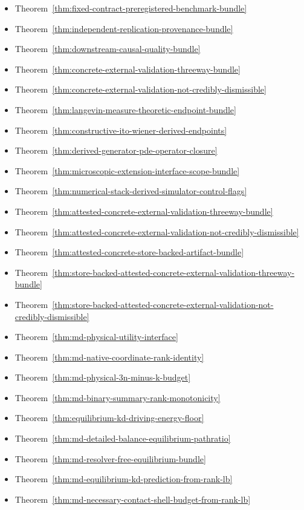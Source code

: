 \begin{itemize}
\item Theorem~\ref{thm:fixed-contract-preregistered-benchmark-bundle}
\item Theorem~\ref{thm:independent-replication-provenance-bundle}
\item Theorem~\ref{thm:downstream-causal-quality-bundle}
\item Theorem~\ref{thm:concrete-external-validation-threeway-bundle}
\item Theorem~\ref{thm:concrete-external-validation-not-credibly-dismissible}
\item Theorem~\ref{thm:langevin-measure-theoretic-endpoint-bundle}
\item Theorem~\ref{thm:constructive-ito-wiener-derived-endpoints}
\item Theorem~\ref{thm:derived-generator-pde-operator-closure}
\item Theorem~\ref{thm:microscopic-extension-interface-scope-bundle}
\item Theorem~\ref{thm:numerical-stack-derived-simulator-control-flags}
\item Theorem~\ref{thm:attested-concrete-external-validation-threeway-bundle}
\item Theorem~\ref{thm:attested-concrete-external-validation-not-credibly-dismissible}
\item Theorem~\ref{thm:attested-concrete-store-backed-artifact-bundle}
\item Theorem~\ref{thm:store-backed-attested-concrete-external-validation-threeway-bundle}
\item Theorem~\ref{thm:store-backed-attested-concrete-external-validation-not-credibly-dismissible}
\item Theorem~\ref{thm:md-physical-utility-interface}
\item Theorem~\ref{thm:md-native-coordinate-rank-identity}
\item Theorem~\ref{thm:md-physical-3n-minus-k-budget}
\item Theorem~\ref{thm:md-binary-summary-rank-monotonicity}
\item Theorem~\ref{thm:equilibrium-kd-driving-energy-floor}
\item Theorem~\ref{thm:md-detailed-balance-equilibrium-pathratio}
\item Theorem~\ref{thm:md-resolver-free-equilibrium-bundle}
\item Theorem~\ref{thm:md-equilibrium-kd-prediction-from-rank-lb}
\item Theorem~\ref{thm:md-necessary-contact-shell-budget-from-rank-lb}

\end{itemize}
